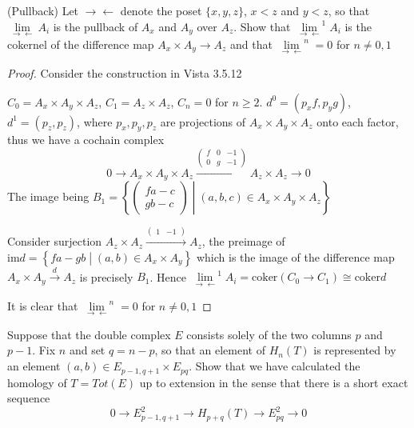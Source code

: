 \documentclass{article}
\newenvironment{exercise}[2][Exercise]{\begin{trivlist}
\item[\hskip \labelsep {\bfseries #1}\hskip \labelsep {\bfseries #2.}]}{\end{trivlist}}
\theoremstyle{definition}
\theoremstyle{remark}
\theoremstyle{definition}
\begin{document}
\begin{exercise}{\textbf{3.5.5}}(Pullback)
Let $\to\leftarrow$ denote the poset $\{x,y,z\}$, $x<z$ and $y<z$, so that $\displaystyle\underset{\to\leftarrow}{\lim}A_i$ is the pullback of $A_x$ and $A_y$ over $A_z$. Show that $\displaystyle\underset{\to\leftarrow}{\lim}^1A_i$ is the cokernel of the difference map $A_x\times A_y\to A_z$ and that $\displaystyle\underset{\to\leftarrow}{\lim}^n=0$ for $n\neq0,1$

\end{exercise}

\begin{proof}
Consider the construction in Vista 3.5.12
\begin{center}
\end{center}
$C_0=A_x\times A_y\times A_z$, $C_1=A_z\times A_z$, $C_n=0$ for $n\geq2$. $d^0=(p_xf,p_yg)$, $d^1=(p_z,p_z)$, where $p_x,p_y,p_z$ are projections of $A_x\times A_y\times A_z$ onto each factor, thus we have a cochain complex
\[0\to A_x\times A_y\times A_z\xrightarrow{\begin{pmatrix}
f&0&-1 \\
0&g&-1
\end{pmatrix}}A_z\times A_z\to0\]
The image being $B_1=\left\{\begin{pmatrix}
fa-c \\
gb-c
\end{pmatrix}\middle|(a,b,c)\in A_x\times A_y\times A_z\right\}$ \par
Consider surjection $A_z\times A_z\xrightarrow{\begin{pmatrix}
1 &-1
\end{pmatrix}}A_z$, the preimage of $\mathrm{im}d=\left\{fa-gb\middle|(a,b)\in A_x\times A_y\right\}$ which is the image of the difference map $A_x\times A_y\xrightarrow dA_z$ is precisely $B_1$. Hence $\displaystyle\underset{\to\leftarrow}{\lim}^1A_i=\mathrm{coker}(C_0\to C_1)\cong\mathrm{coker}d$ \par
It is clear that $\displaystyle\underset{\to\leftarrow}{\lim}^n=0$ for $n\neq0,1$
\end{proof}

\begin{exercise}{\textbf{5.1.1}}
Suppose that the double complex $E$ consists solely of the two columns $p$ and $p-1$. Fix $n$ and set $q=n-p$, so that an element of $H_n(T)$ is represented by an element $(a,b)\in E_{p-1,q+1}\times E_{pq}$. Show that we have calculated the homology of $T=Tot(E)$ up to extension in the sense that there is a short exact sequence
\[0\to E^2_{p-1,q+1}\to H_{p+q}(T)\to E^2_{pq}\to0\]
\end{exercise}
\end{document}
